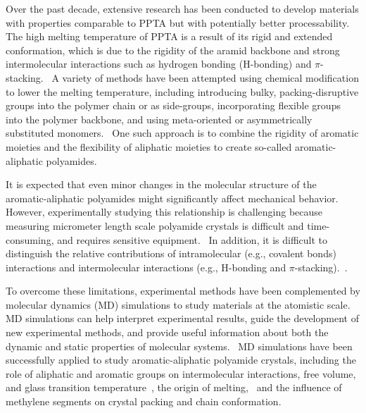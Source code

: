 \documentclass[journal=langd5,manuscript=article]{achemso}
\begin{document}
Over the past decade, extensive research has been conducted to develop materials with properties comparable to PPTA but with potentially better processability.
The high melting temperature of PPTA is a result of its rigid and extended conformation, which is due to the rigidity of the aramid backbone and strong intermolecular interactions such as hydrogen bonding (H-bonding) and $\pi$-stacking.~\cite{rutledge1991analysis,deshmukh2016conformational, crouch2017fibres,brown1977thermal,tonelli2020poly}
A variety of methods have been attempted using chemical modification to lower the melting temperature, including introducing bulky, packing-disruptive groups into the polymer chain or as side-groups, incorporating flexible groups into the polymer backbone, and using meta-oriented or asymmetrically substituted monomers.~\cite{khademinejad2016poly,liou2007synthesis,amininasab2016preparation,hajibeygi2016new,zou2016synthesis,zhang2016effects,damaceanu2011organosoluble,long2020tuning}
One such approach is to combine the rigidity of aromatic moieties and the flexibility of aliphatic moieties to create so-called aromatic-aliphatic polyamides.~\cite{deshmukh2016conformational,peng2018novel,bakkali2018synthesis,rwei2018synthesis,rwei2018synthesisof,bisoi2017aromatic}

It is expected that even minor changes in the molecular structure of the aromatic-aliphatic polyamides might significantly affect mechanical behavior.
However, experimentally studying this relationship is challenging because measuring micrometer length scale polyamide crystals is difficult and time-consuming, and requires sensitive equipment.~\cite{prevorsek1994analysis,cline2018assessment,sockalingam2017recent}
In addition, it is difficult to distinguish the relative contributions of intramolecular (e.g., covalent bonds) interactions and intermolecular interactions (e.g., H-bonding and $\pi$-stacking).~\cite{tashiro1977elastic}.

To overcome these limitations, experimental methods have been complemented by molecular dynamics (MD) simulations to study materials at the atomistic scale.~\cite{sockalingam2017recent}
MD simulations can help interpret experimental results, guide the development of new experimental methods, and provide useful information about both the dynamic and static properties of molecular systems.~\cite{moe1995molecular,zhang2016mesodyn,zhelavskyi2019atomistic}
MD simulations have been successfully applied to study aromatic-aliphatic polyamide crystals, including the role of aliphatic and aromatic groups on intermolecular interactions, free volume, and glass transition temperature~\cite{chantawansri2015investigating,long2020tuning}, the origin of melting,~\cite{deshmukh2016conformational} and the influence of methylene segments on crystal packing and chain conformation.~\cite{deshmukh2016conformational}
\end{document}
